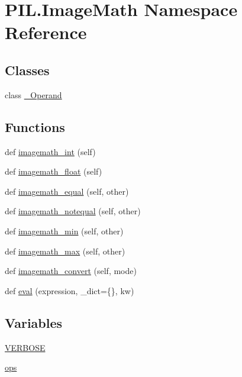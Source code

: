 \hypertarget{namespacePIL_1_1ImageMath}{}\section{P\+I\+L.\+Image\+Math Namespace Reference}
\label{namespacePIL_1_1ImageMath}
\subsection*{Classes}
\begin{DoxyCompactItemize}
\item 
class \hyperlink{classPIL_1_1ImageMath_1_1__Operand}{\+\_\+\+Operand}
\end{DoxyCompactItemize}
\subsection*{Functions}
\begin{DoxyCompactItemize}
\item 
def \hyperlink{namespacePIL_1_1ImageMath_a8819e894539c609ef6c285c0d4bebe12}{imagemath\+\_\+int} (self)
\item 
def \hyperlink{namespacePIL_1_1ImageMath_aea2f7a761d0e89c23971c3f6f303b654}{imagemath\+\_\+float} (self)
\item 
def \hyperlink{namespacePIL_1_1ImageMath_a0095fda030ff2348c30e22e0675144fa}{imagemath\+\_\+equal} (self, other)
\item 
def \hyperlink{namespacePIL_1_1ImageMath_a639bbbe9094349df5813f3cacad70378}{imagemath\+\_\+notequal} (self, other)
\item 
def \hyperlink{namespacePIL_1_1ImageMath_ae5e95b486aae843e33495a701a105655}{imagemath\+\_\+min} (self, other)
\item 
def \hyperlink{namespacePIL_1_1ImageMath_a8fb9d72aab95044895a96fe628293717}{imagemath\+\_\+max} (self, other)
\item 
def \hyperlink{namespacePIL_1_1ImageMath_ae79b7f9ad3b2816809181724781efa3b}{imagemath\+\_\+convert} (self, mode)
\item 
def \hyperlink{namespacePIL_1_1ImageMath_a2b820ed73b7399ea0bb00e312a2994a1}{eval} (expression, \+\_\+dict=\{\}, kw)
\end{DoxyCompactItemize}
\subsection*{Variables}
\begin{DoxyCompactItemize}
\item 
\hyperlink{namespacePIL_1_1ImageMath_a1b43a66ccd78614ab99643e01a71e948}{V\+E\+R\+B\+O\+SE}
\item 
\hyperlink{namespacePIL_1_1ImageMath_a1330fc2377aa9f9b5858a864d8ea5cb6}{ops}
\end{DoxyCompactItemize}



